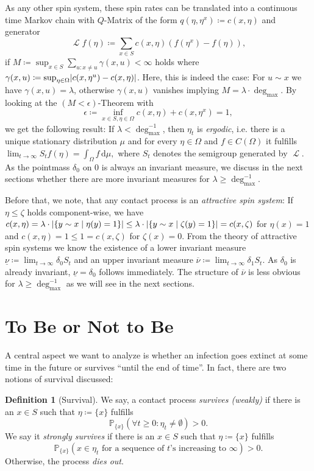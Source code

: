 \documentclass[a4paper,11pt]{amsart}
\theoremstyle{theorem}
\theoremstyle{definition}
\newtheorem{definition}[theorem]{Definition}
\newcommand{\Cont}{C}
\newcommand{\diff}{\,\mathrm{d}}
\renewcommand{\P}{\mathbb{P}}
\DeclareMathOperator{\LGen}{\mathcal{L}}
\DeclarePairedDelimiter\abs{\lvert}{\rvert}%
\begin{document}
As any other spin system, these spin rates can be translated into a continuous time Markov chain with $Q$-Matrix of the form $q(\eta, \eta^x) \coloneqq c(x,\eta)$ and generator
$$
\LGen f(\eta) \coloneqq \sum_{x\in S} c(x,\eta) \left( f(\eta^x) - f(\eta) \right),
$$
if $M\coloneqq \sup_{x\in S} \sum_{u:x\neq u} \gamma(x,u) < \infty$ holds where $\gamma(x,u)\coloneqq \sup_{\eta\in\Omega} \abs{ c(x,\eta^u) - c(x,\eta) }$.
Here, this is indeed the case:
For $u\sim x$ we have $\gamma(x,u)=\lambda$, otherwise $\gamma(x,u)$ vanishes implying $M = \lambda \cdot \deg_{\max}$.
By looking at the $(M<\epsilon)$-Theorem with $$\epsilon\coloneqq \inf_{x\in S, \eta\in \Omega} c(x,\eta)+ c(x,\eta^x) = 1,$$ we get the following result:
If  $\lambda <\deg_{\max}^{-1}$, then $\eta_t$ is \emph{ergodic}, i.e. there is a unique stationary distribution $\mu$ and for every $\eta\in\Omega$ and $f\in \Cont(\Omega)$ it fulfills $\lim_{t\to\infty} S_t f(\eta) = \int_\Omega f \diff \mu,$
where $S_t$ denotes the semigroup generated by $\LGen$.
As the pointmass $\delta_0$ on $0$ is always an invariant measure, we discuss in the next sections whether there are more invariant measures for $\lambda \geq \deg_{\max}^{-1}$.


Before that, we note, that any contact process is an \emph{attractive spin system}: If $\eta \leq \zeta$ holds component-wise, we have $c(x,\eta) = \lambda \cdot \abs{ \{ y\sim x\mid \eta(y) = 1 \}}\leq \lambda \cdot \abs{\{ y\sim x\mid \zeta(y) = 1 \}} = c(x,\zeta)$ for $\eta(x) = 1$ and $c(x, \eta) = 1 \leq 1 = c(x,\zeta)$ for $\zeta(x)=0$.
From the theory of attractive spin systems we know the existence of a lower invariant measure $\underline{\nu}\coloneqq \lim_{t\to\infty} \delta_0 S_t$
and an upper invariant measure $\overline{\nu} \coloneqq \lim_{t\to\infty} \delta_1 S_t$.
As $\delta_0$ is already invariant, $\underline{\nu} = \delta_0$ follows immediately.
The structure of $\overline{\nu}$ is less obvious for $\lambda \geq \deg_{\max}^{-1}$ as we will see in the next sections.


\section{To Be or Not to Be}
A central aspect we want to analyze is whether an infection goes extinct at some time in the future or survives ``until the end of time''.
In fact, there are two notions of survival discussed:

\begin{definition}[Survival]
	We say, a contact process \emph{survives (weakly)} if there is an $x\in S$ such that $\eta \coloneqq \{ x \}$ fulfills $$\P_{\{x\}}(\forall t \geq 0: \eta_t \neq \emptyset) > 0.$$
	We say it \emph{strongly survives} if there is an $x\in S$ such that $\eta\coloneqq \{ x \}$ fulfills $$\P_{\{ x \}}( x \in \eta_t \text{ for a sequence of $t$'s increasing to $\infty$}) > 0.$$
	Otherwise, the process \emph{dies out}.
\end{definition}
\end{document}
